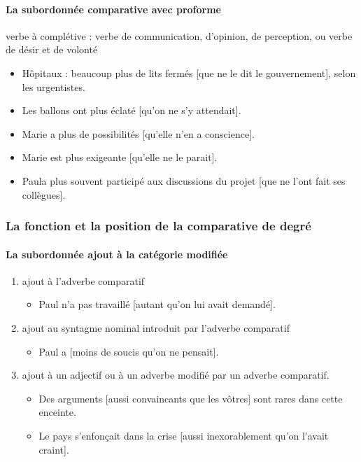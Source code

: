 \documentclass[UTF8]{report}
\begin{document}
\paragraph{La subordonnée comparative avec proforme}
verbe à complétive : verbe de communication, d’opinion, de perception, ou verbe de désir et de volonté
\begin{itemize}
    \item Hôpitaux : beaucoup plus de lits fermés [que ne le dit le gouvernement], selon les urgentistes. 
    \item Les ballons ont plus éclaté [qu’on ne s’y attendait].
    \item Marie a plus de possibilités [qu’elle n’en a conscience].
    \item Marie est plus exigeante [qu’elle ne le parait].
    \item Paula plus souvent participé aux discussions du projet [que ne l’ont fait ses collègues].
\end{itemize}

\subsubsection{La fonction et la position de la comparative de degré}
\paragraph{La subordonnée ajout à la catégorie modifiée}
\begin{enumerate}
    \item ajout à l’adverbe comparatif
    \begin{itemize}
        \item Paul n’a pas travaillé [autant qu’on lui avait demandé].
    \end{itemize}
    \item ajout au syntagme nominal introduit par l’adverbe comparatif
    \begin{itemize}
        \item Paul a [moins de soucis qu’on ne pensait].
    \end{itemize}
    \item ajout à un adjectif ou à un adverbe modifié par un adverbe comparatif.
    \begin{itemize}
        \item Des arguments [aussi convaincants que les vôtres] sont rares dans cette enceinte.
        \item Le pays s’enfonçait dans la crise [aussi inexorablement qu’on l’avait craint].
    \end{itemize}
\end{enumerate}
\end{document}
